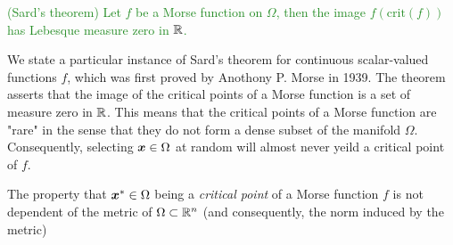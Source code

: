 \documentclass[10pt]{article}
\begin{document}
\begin{theorem}
    \textcolor{ForestGreen}{
        (Sard's theorem) Let $f$ be a Morse function on $\Omega$, then
        the image $f(\text{crit}(f))$ has Lebesque measure zero in $\mathbb{R}$.
    }
\end{theorem}

\begin{remark}
    We state a particular instance of Sard's theorem for continuous scalar-valued functions $f$,
    which was first proved by Anothony P. Morse in 1939.
    The theorem asserts that the image of the critical points of a Morse function is a set 
    of measure zero in $\mathbb{R}$. This means that the critical points of a Morse function are "rare" in the sense that they
    do not form a dense subset of the manifold $\Omega$.
    Consequently, selecting $\bm{x} \in \Omega$ at random will almost never yeild a critical
    point of $f$.
\end{remark}

\begin{remark}
    The property that $\bm{x}^* \in \Omega$ being a \emph{critical point} of a Morse function $f$ is
    not dependent of the metric of $\Omega \subset \mathbb{R}^n$ (and consequently, the norm induced by the metric)
\end{remark}






    
\end{document}
